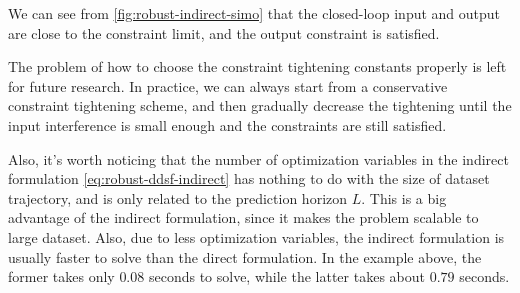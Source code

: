 We can see from \cref{fig:robust-indirect-simo} that the closed-loop input and output are close to the constraint limit, and the output constraint is satisfied.


The problem of how to choose the constraint tightening constants properly is left for future research.
In practice, we can always start from a conservative constraint tightening scheme, and then gradually decrease the tightening until the input interference is small enough and the constraints are still satisfied.

Also, it's worth noticing that the number of optimization variables in the indirect formulation \cref{eq:robust-ddsf-indirect} has nothing to do with the size of dataset trajectory, and is only related to the prediction horizon $L$.
This is a big advantage of the indirect formulation, since it makes the problem scalable to large dataset.
Also, due to less optimization variables, the indirect formulation is usually faster to solve than the direct formulation.
In the example above, the former takes only $0.08$ seconds to solve, while the latter takes about $0.79$ seconds.
